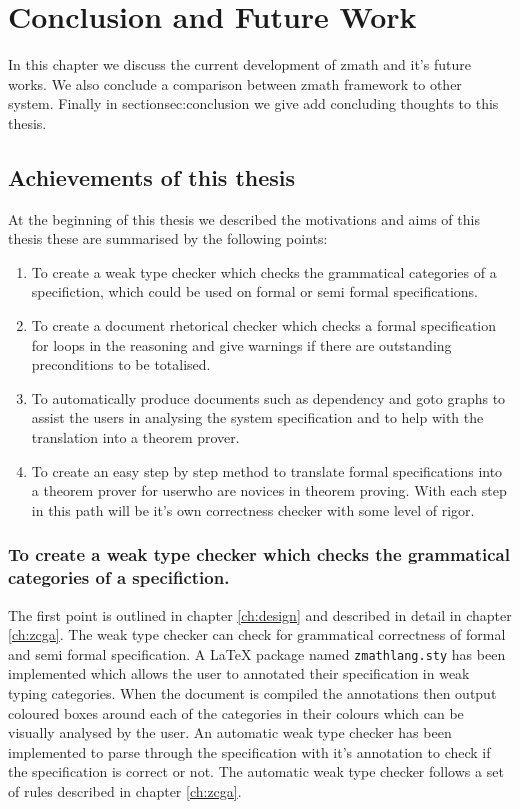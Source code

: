 \chapter{Conclusion and Future Work}
\label{ch:conclusion}

In this chapter we discuss the current development of \gls{zmath} and it's future works. We also conclude a comparison between \gls{zmath} framework to other system. Finally in section{sec:conclusion} we give add concluding thoughts to this thesis.


\section{Achievements of this thesis}

At the beginning of this thesis we described the motivations and aims of this thesis these are summarised by the following points:

\begin{enumerate}

\item To create a weak type checker which checks the grammatical categories of a specifiction, which could be used on formal or semi formal specifications.

\item To create a document rhetorical checker which checks a formal specification for loops in the reasoning and give warnings if there are outstanding preconditions to be totalised.

\item To automatically produce documents such as dependency and goto graphs to assist the users in analysing the system specification and to help with the translation into a theorem prover.

\item To create an easy step by step method to translate formal specifications into a theorem prover for userwho are novices in theorem proving. With each step in this path will be it's own correctness checker with some level of rigor.

\end{enumerate}

\subsection{To create a weak type checker which checks the grammatical categories of a specifiction.}

The first point is outlined in chapter \ref{ch:design} and described in detail in chapter \ref{ch:zcga}. The weak type checker can check for grammatical correctness of formal and semi formal specification. A \LaTeX{} package named \texttt{zmathlang.sty} has been implemented which allows the user to annotated their specification in weak typing categories. When the document is compiled the annotations then output coloured boxes around each of the categories in their colours which can be visually analysed by the user. An automatic weak type checker has been implemented to parse through the specification with it's annotation to check if the specification is correct or not. The automatic weak type checker follows a set of rules described in chapter \ref{ch:zcga}.

